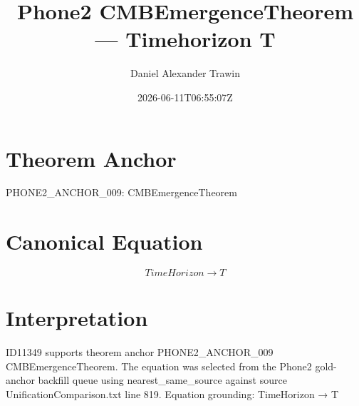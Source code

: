 \documentclass[11pt]{article}
\title{Phone2 CMBEmergenceTheorem — Timehorizon T}
\author{Daniel Alexander Trawin}
\date{2026-06-11T06:55:07Z}
\begin{document}
\maketitle
\section*{Theorem Anchor}
PHONE2_ANCHOR_009: CMBEmergenceTheorem
\section*{Canonical Equation}
\[
TimeHorizon → T
\]
\section*{Interpretation}
ID11349 supports theorem anchor PHONE2_ANCHOR_009 CMBEmergenceTheorem. The equation was selected from the Phone2 gold-anchor backfill queue using nearest_same_source against source UnificationComparison.txt line 819. Equation grounding: TimeHorizon → T
\end{document}
